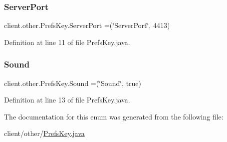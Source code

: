\subsubsection{\texorpdfstring{Server\+Port}{ServerPort}}
{\footnotesize\ttfamily client.\+other.\+Prefs\+Key.\+Server\+Port =(\char`\"{}Server\+Port\char`\"{}, 4413)}



Definition at line 11 of file Prefs\+Key.\+java.

\hypertarget{enumclient_1_1other_1_1_prefs_key_a8ad253d1a3c77e65df307909afb7f52f}{}\label{enumclient_1_1other_1_1_prefs_key_a8ad253d1a3c77e65df307909afb7f52f} 
\subsubsection{\texorpdfstring{Sound}{Sound}}
{\footnotesize\ttfamily client.\+other.\+Prefs\+Key.\+Sound =(\char`\"{}Sound\char`\"{}, true)}



Definition at line 13 of file Prefs\+Key.\+java.



The documentation for this enum was generated from the following file\+:\begin{DoxyCompactItemize}
\item 
client/other/\hyperlink{client_2other_2_prefs_key_8java}{Prefs\+Key.\+java}\end{DoxyCompactItemize}
